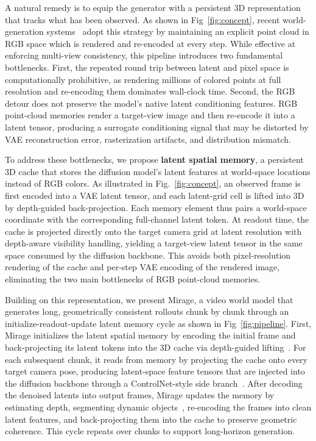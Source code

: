 \documentclass{llmxive}
\providecommand{\method}{Mirage\xspace}
\begin{document}
A natural remedy is to equip the generator with a persistent 3D representation that tracks what has been observed. As shown in Fig~\ref{fig:concept}, recent world-generation systems~\cite{zhao2026spatia,huang2025voyager,yu2024wonderworld,yu2024wonderjourney,duan2026liveworld,wang2025drivegen3d,wang2026world,wu2025video,chou2025captain} adopt this strategy by maintaining an explicit point cloud in RGB space which is rendered and re-encoded at every step. While effective at enforcing multi-view consistency, this pipeline introduces two fundamental bottlenecks. First, the repeated round trip between latent and pixel space is computationally prohibitive, as rendering millions of colored points at full resolution and re-encoding them dominates wall-clock time. Second, the RGB detour does not preserve the model's native latent conditioning features. RGB point-cloud memories render a target-view image and then re-encode it into a latent tensor, producing a surrogate conditioning signal that may be distorted by VAE reconstruction error, rasterization artifacts, and distribution mismatch.

To address these bottlenecks, we propose \textbf{latent spatial memory}, a persistent 3D cache that stores the diffusion model's latent features at world-space locations instead of RGB colors. As illustrated in Fig.~\ref{fig:concept}, an observed frame is first encoded into a VAE latent tensor, and each latent-grid cell is lifted into 3D by depth-guided back-projection. Each memory element thus pairs a world-space coordinate with the corresponding full-channel latent token. At readout time, the cache is projected directly onto the target camera grid at latent resolution with depth-aware visibility handling, yielding a target-view latent tensor in the same space consumed by the diffusion backbone. This avoids both pixel-resolution rendering of the cache and per-step VAE encoding of the rendered image, eliminating the two main bottlenecks of RGB point-cloud memories.

Building on this representation, we present \method{}, a video world model that generates long, geometrically consistent rollouts chunk by chunk through an initialize-readout-update latent memory cycle as shown in Fig~\ref{fig:pipeline}. 
First, \method{} initializes the latent spatial memory by encoding the initial frame and back-projecting its latent tokens into the 3D cache via depth-guided lifting~\cite{lin2025depth,wang2026feed,wang2025zpressor,wang2025volsplat,wang2026trisplat}. 
For each subsequent chunk, it reads from memory by projecting the cache onto every target camera pose, producing latent-space feature tensors that are injected into the diffusion backbone through a ControlNet-style side branch~\cite{zhang2023adding}. 
After decoding the denoised latents into output frames, \method{} updates the memory by estimating depth, segmenting dynamic objects~\cite{carion2025sam3segmentconcepts}, re-encoding the frames into clean latent features, and back-projecting them into the cache to preserve geometric coherence. 
This cycle repeats over chunks to support long-horizon generation. %
\end{document}
